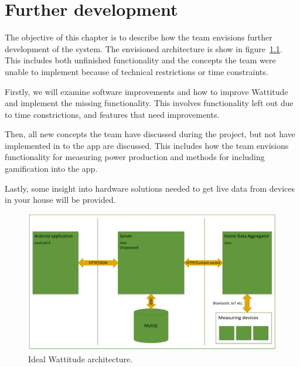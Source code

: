 \chapter{Further development}
\label{chapter:further}

The objective of this chapter is to describe how the team envisions further development of the system. The envisioned architecture is show in figure~\ref{fig:idealArchitecture}. This includes both unfinished functionality and the concepts the team were unable to implement because of technical restrictions or time constraints.

Firstly, we will examine software improvements and how to improve Wattitude and implement the missing functionality. This involves functionality left out due to time constrictions, and features that need improvements. 

Then, all new concepts the team have discussed during the project, but not have implemented in to the app are discussed. This includes how the team envisions functionality for measuring power production and methods for including gamification into the app. 

Lastly, some insight into hardware solutions needed to get live data from devices in your house will be provided. 

\begin{figure}[H]
\centering
\includegraphics[height=0.3\textheight]{ch/further/fig/architecture.png}
\caption{Ideal Wattitude architecture.}
\label{fig:idealArchitecture}
\end{figure}




